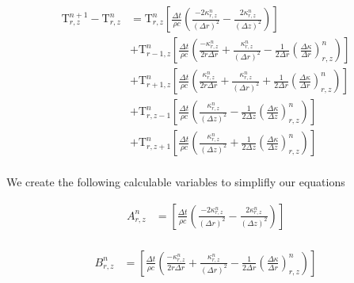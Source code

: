 \documentclass[12pt]{article}
\begin{document}
		\begin{equation}
		\begin{aligned}
		\mathrm{T}^{n+1}_{r, z} - \mathrm{T}^{n}_{r, z} &=  \mathrm{T}^{n}_{r, z} \left [ \frac{\Delta t}{\rho c} \left (\frac{-2\kappa^n_{r, z}}{(\Delta r)^2} -\frac{2\kappa^n_{r, z}}{(\Delta z)^2} \right ) \right ] \\
		&+ \mathrm{T}^{n}_{r - 1, z} \left [ \frac{\Delta t}{\rho c} \left (\frac{-\kappa^n_{r, z}}{2r\Delta r} + \frac{\kappa^n_{r, z}}{(\Delta r)^2} - \frac{1}{2\Delta r} \left(\frac{\Delta\kappa}{\Delta r}\right)^n_{r, z} \right )\right ] \\
    &+ \mathrm{T}^{n}_{r + 1, z} \left [ \frac{\Delta t}{\rho c} \left (\frac{\kappa^n_{r, z}}{2r\Delta r} + \frac{\kappa^n_{r, z}}{(\Delta r)^2} + \frac{1}{2\Delta r}\left(\frac{\Delta\kappa}{\Delta r}\right)^n_{r, z} \right ) \right ] \\
		&+ \mathrm{T}^{n}_{r, z - 1} \left [ \frac{\Delta t}{\rho c}\left (\frac{\kappa^n_{r, z}}{(\Delta z)^2} - \frac{1}{2\Delta z}\left(\frac{\Delta\kappa}{\Delta z}\right)^n_{r, z} \right ) \right ] \\
		&+ \mathrm{T}^{n}_{r, z + 1} \left [ \frac{\Delta t}{\rho c}\left ( \frac{\kappa^n_{r, z}}{(\Delta z)^2} + \frac{1}{2\Delta z}\left(\frac{\Delta\kappa}{\Delta z}\right )^n_{r, z} \right ) \right ] \\
		\end{aligned}
		\end{equation}
		
    We create the following calculable variables to simplifly our equations

		\begin{equation}
		\begin{aligned}
		A^n_{r, z} &= \left [ \frac{\Delta t}{\rho c}\left (\frac{-2\kappa^n_{r, z}}{(\Delta r)^2} -\frac{2\kappa^n_{r, z}}{(\Delta z)^2} \right ) \right ] \\
		\end{aligned}
		\end{equation}
		
		\begin{equation}
		\begin{aligned}
		B^n_{r, z} &= \left [ \frac{\Delta t}{\rho c}\left (\frac{-\kappa^n_{r, z}}{2r\Delta r} + \frac{\kappa^n_{r, z}}{(\Delta r)^2} - \frac{1}{2\Delta r} \left(\frac{\Delta\kappa}{\Delta r}\right)^n_{r, z} \right )\right ]
		\end{aligned}
		\end{equation}
\end{document}
